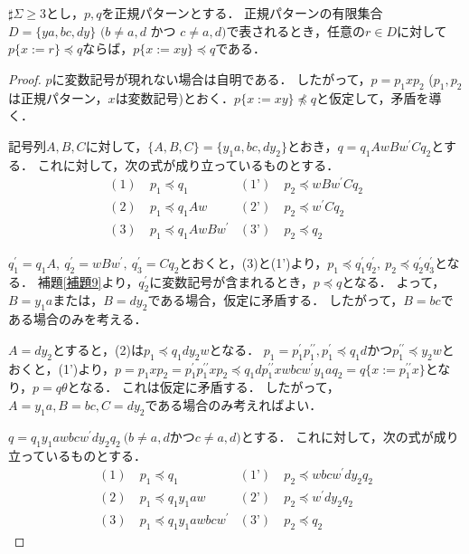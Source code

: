 \begin{lem}\label{追加部分}
$\sharp \Sigma \ge 3$とし，$p, q$を正規パターンとする．
正規パターンの有限集合$D= \{ ya, bc, dy \}$ $(b \not = a,d$ かつ $c \not = a,d)$で表されるとき，任意の$r \in D$に対して$p \{ x := r \} \preceq q$ならば，$p \{ x := xy \} \preceq q$である．
\end{lem}
\begin{proof}
$p$に変数記号が現れない場合は自明である．
したがって，$p=p_{1}xp_{2}$ ($p_{1}, p_{2}$は正規パターン，$x$は変数記号)とおく．$p \{ x := xy \} \not \preceq q$と仮定して，矛盾を導く．

記号列$A,B,C$に対して，$\{ A,B,C \} = \{ y_{1}a,bc,dy_{2} \}$とおき，$q=q_{1}AwBw^{\prime}Cq_{2}$とする．
これに対して，次の式が成り立っているものとする．
\begin{align*}
(1)~& p_{1} \preceq q_{1} & (\text{1'})~& p_{2} \preceq wBw^{\prime}Cq_{2} \\
(2)~& p_{1} \preceq q_{1}Aw & (\text{2'})~& p_{2} \preceq w^{\prime}Cq_{2} \\
(3)~& p_{1} \preceq q_{1}AwBw^{\prime} & (\text{3'})~& p_{2} \preceq q_{2}
\end{align*}

$q^{\prime}_{1}=q_{1}A,~q^{\prime}_{2}=wBw^{\prime},~q^{\prime}_{3}=Cq_{2}$とおくと，(3)と(1')より，$p_{1} \preceq q^{\prime}_{1}q^{\prime}_{2},~p_{2} \preceq q^{\prime}_{2}q^{\prime}_{3}$となる．
補題\ref{補題9}より，$q^{\prime}_{2}$に変数記号が含まれるとき，$p \preceq q$となる．
よって，$B=y_{1}a$または，$B=dy_{2}$である場合，仮定に矛盾する．
したがって，$B=bc$である場合のみを考える．

$A=dy_{2}$とすると，(2)は$p_{1} \preceq q_{1}dy_{2}w$となる．
$p_{1}=p^{\prime}_{1}p^{\prime\prime}_{1}, p^{\prime}_{1} \preceq q_{1}d$かつ$p^{\prime\prime}_{1} \preceq y_{2}w$とおくと，(1')より，$p=p_{1}xp_{2}=p^{\prime}_{1}p^{\prime\prime}_{1}xp_{2} \preceq q_{1}dp^{\prime\prime}_{1}xwbcw^{\prime}y_{1}aq_{2}=q \{ x:=p^{\prime\prime}_{1}x \}$となり，$p=q\theta$となる．
これは仮定に矛盾する．
したがって，$A=y_{1}a,B=bc,C=dy_{2}$である場合のみ考えればよい．

$q=q_{1}y_{1}awbcw^{\prime}dy_{2}q_{2}~(b \not = a,d$かつ$c \not = a,d)$とする．
これに対して，次の式が成り立っているものとする．
\begin{align*}
(1)~& p_{1} \preceq q_{1} & (\text{1'})~& p_{2} \preceq wbcw^{\prime}dy_{2}q_{2} \\
(2)~& p_{1} \preceq q_{1}y_{1}aw & (\text{2'})~& p_{2} \preceq w^{\prime}dy_{2}q_{2} \\
(3)~& p_{1} \preceq q_{1}y_{1}awbcw^{\prime} & (\text{3'})~& p_{2} \preceq q_{2}
\end{align*}


\end{proof}

